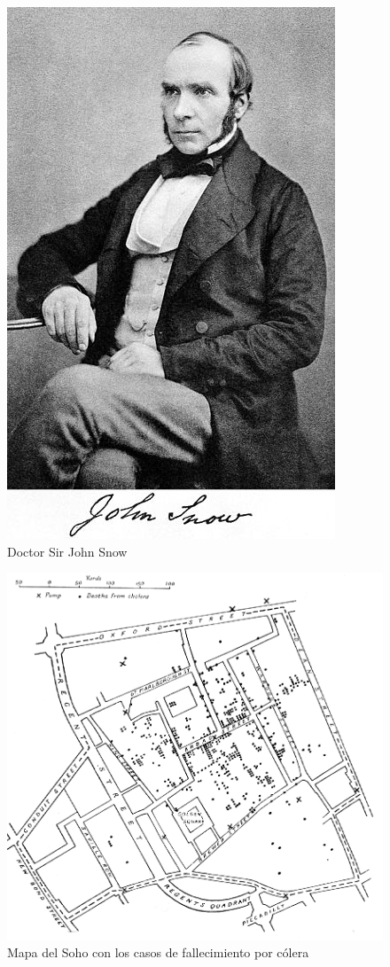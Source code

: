 \begin{figure}[hbtp]
\centering
\includegraphics[scale=1, fbox={\fboxrule} 0mm]{images/03-antecedentes/02-john_snow.jpg}
\caption{Doctor Sir John Snow}
\label{fig:john_snow}
\end{figure}

\begin{figure}[hbtp]
\centering
\includegraphics[scale=0.5, fbox={\fboxrule} 4mm]{images/03-antecedentes/01-cholera_map.jpg}
\caption{Mapa del Soho con los casos de fallecimiento por cólera}
\label{fig:cholera_map}
\end{figure}

